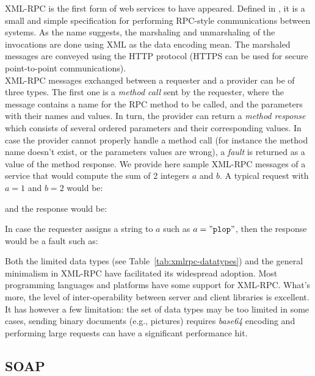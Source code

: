 XML-RPC is the first form of web services to have appeared. Defined in \cite{DW98}, it is a small and simple specification for performing RPC-style communications between systems. As the name suggests, the marshaling and unmarshaling of the invocations are done using XML as the data encoding mean. The marshaled messages are conveyed using the HTTP protocol (HTTPS can be used for secure point-to-point communications).\\

XML-RPC messages exchanged between a requester and a provider can be of three types. The first one is a \emph{method call} sent by the requester, where the message contains a name for the RPC method to be called, and the parameters with their names and values. In turn, the provider can return a \emph{method response} which consists of several ordered parameters and their corresponding values. In case the provider cannot properly handle a method call (for instance the method name doesn't exist, or the parameters values are wrong), a \emph{fault} is returned as a value of the method response. We provide here sample XML-RPC messages of a service that would compute the sum of 2 integers $a$ and $b$. A typical request with $a = 1$ and $b = 2$ would be:

and the response would be:

In case the requester assigns a string to $a$ such as $a = "\mbox{\texttt{plop}}"$, then the response would be a fault such as:
 \

Both the limited data types (see Table~\ref{tab:xmlrpc-datatypes}) and the general minimalism in XML-RPC have facilitated its widespread adoption. Most programming languages and platforms have some support for XML-RPC. What's more, the level of inter-operability between server and client libraries is excellent. It has however a few limitation: the set of data types may be too limited in some cases, sending binary documents (e.g., pictures) requires \emph{base64} encoding and performing large requests can have a significant performance hit.


\subsection{SOAP}


